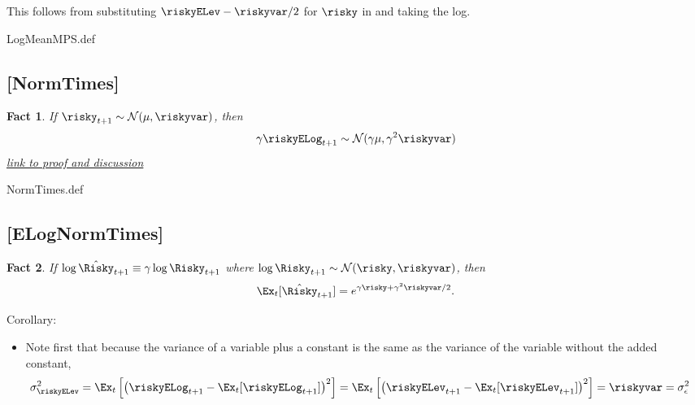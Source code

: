 \documentclass{handout}
\newtheorem{Fact}{Fact}
\begin{document}
This follows from substituting $\riskyELev - \riskyvar/2$ for $\risky$ in {\ELogNorm} and taking the log.

\begin{verbatimwrite}{LogMeanMPS.def}
\providecommand{\LogMeanMPS}{\href{https://www.econ2.jhu.edu/people/ccarroll/public/LectureNotes/MathFacts/MathFactsList\#LogMeanMPS}{\ensuremath{\mathtt{[LogMeanMPS]}}}}
\end{verbatimwrite}


\hypertarget{NormTimes}{}
\subsection{[NormTimes]}\label{NormTimes}

\begin{Fact} If $\risky_{t+1} \sim \mathcal{N}(\mu,\riskyvar)$, then
\begin{equation}
        \gamma \riskyELog_{t+1} \sim \mathcal{N}(\gamma \mu,\gamma^{2} \riskyvar)
      \end{equation}
\indent      \href{https://math.stackexchange.com/questions/1543687}{link to proof and discussion}
\end{Fact}

\begin{verbatimwrite}{NormTimes.def}
\providecommand{\NormTimes}{\href{https://www.econ2.jhu.edu/people/ccarroll/public/LectureNotes/MathFacts/MathFactsList\#NormTimes}{\ensuremath{\mathtt{[NormTimes]}}}}
\end{verbatimwrite}

\hypertarget{ELogNormTimes}{}
\subsection{[ELogNormTimes]}

\begin{Fact} If $\log \hat{\Risky}_{t+1} \equiv \gamma \log \Risky_{t+1}$ where $\log \Risky_{t+1} \sim \mathcal{N}(\risky,\riskyvar)$, then
\begin{equation}
        \Ex_{t}[\hat{\Risky}_{t+1}] = e^{\gamma \risky+\gamma^{2}\riskyvar/2} \label{eq:ELogNormTimes}.
      \end{equation}

      
    \end{Fact}
    
    Corollary:
    \begin{itemize}
    \item Note first that because the variance of a variable plus a constant is the same as the variance of the variable without the added constant,
      \begin{align}
        \sigma^{2}_{\riskyELev}= \Ex_{t}\left[\left(\riskyELog_{t+1}-\Ex_{t}[\riskyELog_{t+1}]\right)^{2}\right] =\Ex_{t}\left[\left(\riskyELev_{t+1}-\Ex_{t}[\riskyELev_{t+1}]\right)^{2}\right] = \riskyvar & = \sigma^{2}_{\epsilon}
      \end{align}
    \end{itemize}
    
\end{document}
